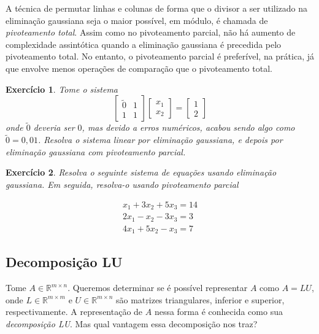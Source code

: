 \documentclass[]{article}
\newtheorem{exercicio}{Exercício}
\numberwithin{equation}{section}
\begin{document}
A técnica de permutar linhas e colunas de forma que o divisor a ser utilizado na eliminação gaussiana seja o maior possível, em módulo, é chamada de \emph{pivoteamento total}. Assim como no pivoteamento parcial, não há aumento de complexidade assintótica quando a eliminação gaussiana é precedida pelo pivoteamento total. No entanto, o pivoteamento parcial é preferível, na prática, já que envolve menos operações de comparação que o pivoteamento total.

\begin{exercicio}
	Tome o sistema
	$$
	\begin{bmatrix}
	\tilde{0} & 1 \\
	1 & 1
	\end{bmatrix}
	\begin{bmatrix}
	x_1 \\
	x_2
	\end{bmatrix}
	=
	\begin{bmatrix}
	1 \\
	2
	\end{bmatrix}
	$$
	onde $\tilde{0}$ deveria ser $0$, mas devido a erros numéricos, acabou sendo algo como $\tilde{0} = 0,01$. Resolva o sistema linear por eliminação gaussiana, e depois por eliminação gaussiana com pivoteamento parcial.
\end{exercicio}

\begin{exercicio}
  Resolva o seguinte sistema de equações usando eliminação gaussiana. Em seguida, resolva-o usando pivoteamento parcial

  \begin{align}
  x_1 + 3x_2 + 5x_3 = 14 \\
  2x_1 - x_2 - 3x_3 = 3 \\
  4x_1 + 5x_2 - x_3 = 7
  \end{align}
\end{exercicio}

\subsection{Decomposição LU}

Tome $A \in \mathbb{R}^{m \times n}$. Queremos determinar se é possível representar $A$ como $A = LU$, onde $L \in \mathbb{R}^{m \times m}$ e $U \in \mathbb{R}^{m \times n}$ são matrizes triangulares, inferior e superior, respectivamente. A representação de $A$ nessa forma é conhecida como sua \emph{decomposição LU}. Mas qual vantagem essa decomposição nos traz?
\end{document}
